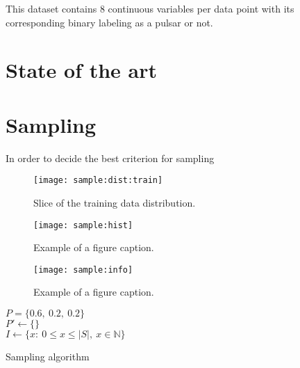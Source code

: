 \documentclass[conference]{IEEEtran}
\begin{document}
This dataset contains 8 continuous variables per data point with its corresponding
binary labeling as a pulsar or not. 

\section{State of the art\label{sec:state_of_art}}

\todo{}

\section{Sampling\label{sec:sampling}}

In order to decide the best criterion for sampling


\begin{figure}[h]
    \texttt{[image: sample:dist:train]}
    \caption{Slice of the training data distribution. \label{fig:sample:dist:train}}
\end{figure}

\begin{figure*}[h]
    \texttt{[image: sample:hist]}
    \caption{Example of a figure caption. \label{fig:sample:hist}}
\end{figure*}

\begin{figure}[h]
    \texttt{[image: sample:info]}
    \caption{Example of a figure caption. \label{fig:sample:info}}
\end{figure}

\begin{algorithm}
    $P = \{0.6,\ 0.2,\ 0.2\}$\\
    $P' \gets \{\}$\\
    $I \gets \{x:\ 0\leq x\leq \lvert S\rvert,\ x\in\mathbb{N}\}$\\
    \caption{Sampling algorithm}\label{sampling:alg}
\end{algorithm}
\printbibliography
\end{document}
